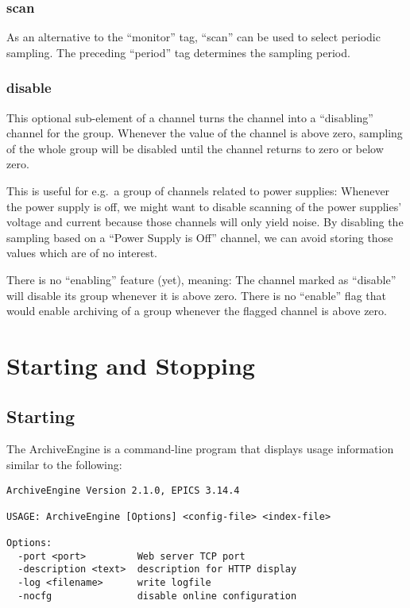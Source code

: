 \subsubsection{scan}
As an alternative to the ``monitor'' tag, ``scan'' can be used to
select periodic sampling. The preceding ``period'' tag determines the
sampling period.

\subsubsection{disable} \label{sec:disable}
This optional sub-element of a channel turns the channel into a
``disabling'' channel for the group. Whenever the value of the channel
is above zero, sampling of the whole group will be disabled until the
channel returns to zero or below zero.

This is useful for e.g.\ a group of channels related to power
supplies: Whenever the power supply is off, we might want to disable
scanning of the power supplies' voltage and current because those
channels will only yield noise. By disabling the sampling based on a
``Power Supply is Off'' channel, we can avoid storing those values
which are of no interest.

\NOTE There is no ``enabling'' feature (yet), meaning: The channel
marked as ``disable'' will disable its group whenever it is above
zero. There is no ``enable'' flag that would enable archiving of a group
whenever the flagged channel is above zero.

\section{Starting and Stopping}
\subsection{Starting}
The ArchiveEngine is a command-line program that displays usage
information similar to the following:

\begin{lstlisting}[frame=none,keywordstyle=\sffamily]
ArchiveEngine Version 2.1.0, EPICS 3.14.4
 
USAGE: ArchiveEngine [Options] <config-file> <index-file>
 
Options:
  -port <port>         Web server TCP port
  -description <text>  description for HTTP display
  -log <filename>      write logfile
  -nocfg               disable online configuration
\end{lstlisting}

